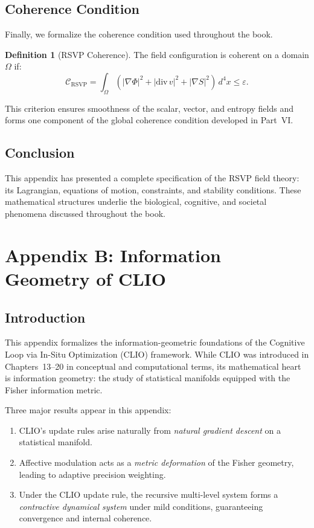 \documentclass[12pt,oneside]{book}
\theoremstyle{plain}
\theoremstyle{definition}
\newtheorem{definition}{Definition}[chapter]
\begin{document}
\section{Coherence Condition}

Finally, we formalize the coherence condition used throughout the book.

\begin{definition}[RSVP Coherence]
The field configuration is coherent on a domain $\Omega$ if:
\[
\mathcal{C}_{\mathrm{RSVP}}
=
\int_\Omega
\left(
|\nabla \Phi|^2
+ |\mathrm{div}\, v|^2
+ |\nabla S|^2
\right)\, d^4x
\le \varepsilon.
\]
\end{definition}

This criterion ensures smoothness of the scalar, vector, and entropy fields and
forms one component of the global coherence condition developed in Part~VI.

\section{Conclusion}

This appendix has presented a complete specification of the RSVP field theory:
its Lagrangian, equations of motion, constraints, and stability conditions.
These mathematical structures underlie the biological, cognitive, and societal
phenomena discussed throughout the book.

\chapter{Appendix B: Information Geometry of CLIO}
\label{appendix:CLIO-geometry}

\section{Introduction}

This appendix formalizes the information-geometric foundations of the
Cognitive Loop via In-Situ Optimization (CLIO) framework.
While CLIO was introduced in Chapters~13--20 in conceptual and computational
terms, its mathematical heart is information geometry:
the study of statistical manifolds equipped with the Fisher information metric.

Three major results appear in this appendix:

\begin{enumerate}
    \item CLIO’s update rules arise naturally from \emph{natural gradient descent}
          on a statistical manifold.
    \item Affective modulation acts as a \emph{metric deformation} of the Fisher
          geometry, leading to adaptive precision weighting.
    \item Under the CLIO update rule, the recursive multi-level
          system forms a \emph{contractive dynamical system} under mild
          conditions, guaranteeing convergence and internal coherence.
\end{enumerate}
\end{document}
